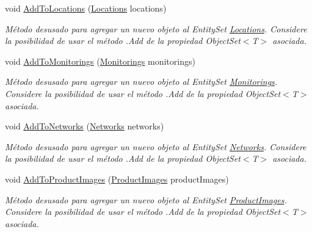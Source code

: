 \begin{DoxyCompactItemize}
void \hyperlink{class_microsoft_1_1_samples_1_1_kinect_1_1_basic_interactions_1_1_o_m_k_t_d_b_entities_ae898cfa718bb3a6a98077d8c84954a1e}{Add\-To\-Locations} (\hyperlink{class_microsoft_1_1_samples_1_1_kinect_1_1_basic_interactions_1_1_locations}{Locations} locations)
\begin{DoxyCompactList}\small\item\em Método desusado para agregar un nuevo objeto al Entity\-Set \hyperlink{class_microsoft_1_1_samples_1_1_kinect_1_1_basic_interactions_1_1_locations}{Locations}. Considere la posibilidad de usar el método .Add de la propiedad Object\-Set$<$T$>$ asociada. \end{DoxyCompactList}\item 
void \hyperlink{class_microsoft_1_1_samples_1_1_kinect_1_1_basic_interactions_1_1_o_m_k_t_d_b_entities_aedb3f7a77bb886af56013b6feabf3ef7}{Add\-To\-Monitorings} (\hyperlink{class_microsoft_1_1_samples_1_1_kinect_1_1_basic_interactions_1_1_monitorings}{Monitorings} monitorings)
\begin{DoxyCompactList}\small\item\em Método desusado para agregar un nuevo objeto al Entity\-Set \hyperlink{class_microsoft_1_1_samples_1_1_kinect_1_1_basic_interactions_1_1_monitorings}{Monitorings}. Considere la posibilidad de usar el método .Add de la propiedad Object\-Set$<$T$>$ asociada. \end{DoxyCompactList}\item 
void \hyperlink{class_microsoft_1_1_samples_1_1_kinect_1_1_basic_interactions_1_1_o_m_k_t_d_b_entities_a127f9ff6d9daf5860c746efad6836a51}{Add\-To\-Networks} (\hyperlink{class_microsoft_1_1_samples_1_1_kinect_1_1_basic_interactions_1_1_networks}{Networks} networks)
\begin{DoxyCompactList}\small\item\em Método desusado para agregar un nuevo objeto al Entity\-Set \hyperlink{class_microsoft_1_1_samples_1_1_kinect_1_1_basic_interactions_1_1_networks}{Networks}. Considere la posibilidad de usar el método .Add de la propiedad Object\-Set$<$T$>$ asociada. \end{DoxyCompactList}\item 
void \hyperlink{class_microsoft_1_1_samples_1_1_kinect_1_1_basic_interactions_1_1_o_m_k_t_d_b_entities_af76d38e2c3d34318634ea4f3c759000d}{Add\-To\-Product\-Images} (\hyperlink{class_microsoft_1_1_samples_1_1_kinect_1_1_basic_interactions_1_1_product_images}{Product\-Images} product\-Images)
\begin{DoxyCompactList}\small\item\em Método desusado para agregar un nuevo objeto al Entity\-Set \hyperlink{class_microsoft_1_1_samples_1_1_kinect_1_1_basic_interactions_1_1_product_images}{Product\-Images}. Considere la posibilidad de usar el método .Add de la propiedad Object\-Set$<$T$>$ asociada. \end{DoxyCompactList}\item 

\end{DoxyCompactItemize}
